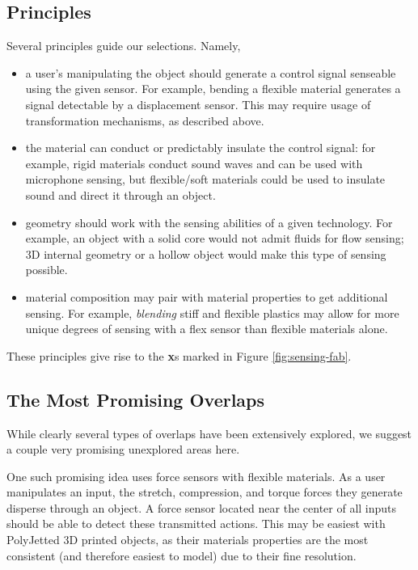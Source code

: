 \subsection{Principles}
    
    Several principles guide our selections. Namely,
    \begin{itemize}
        \item a user's manipulating the object should generate a control signal senseable using the given sensor. For example, bending a flexible material generates a signal detectable by a displacement sensor. This may require usage of transformation mechanisms, as described above.
    
        \item the material can conduct or predictably insulate the control signal: for example, rigid materials conduct sound waves and can be used with microphone sensing, but flexible/soft materials could be used to insulate sound and direct it through an object.
    
        \item geometry should work with the sensing abilities of a given technology. For example, an object with a solid core would not admit fluids for flow sensing; 3D internal geometry or a hollow object would make this type of sensing possible.
      
        \item material composition may pair with material properties to get additional sensing. For example, \emph{blending} stiff and flexible plastics may allow for more unique degrees of sensing with a flex sensor than flexible materials alone. 
    \end{itemize}
    
    These principles give rise to the \textbf{x}s marked in Figure \ref{fig:sensing-fab}.
    
\subsection{The Most Promising Overlaps}

    While clearly several types of overlaps have been extensively explored, we suggest a couple very promising unexplored areas here.
    
    One such promising idea uses force sensors with flexible materials. As a user manipulates an input, the stretch, compression, and torque forces they generate disperse through an object. A force sensor located near the center of all inputs should be able to detect these transmitted actions. This may be easiest with PolyJetted 3D printed objects, as their materials properties are the most consistent (and therefore easiest to model) due to their fine resolution.
    
